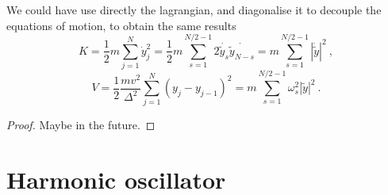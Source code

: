     We could have use directly the lagrangian, and diagonalise it to decouple the equations of motion, to obtain the same results 
    \begin{equation*}
        K = \frac{1}{2} m \sum_{j=1}^{N} \dot y_j^2 = \frac{1}{2} m \sum_{s = 1}^{N/2 - 1} 2 \dot{\tilde y_s} \dot{\tilde y_{N-s}} = m \sum_{s=1}^{N/2 - 1} |\dot{\tilde y}|^2 ~,
    \end{equation*}
    \begin{equation*}
        V = \frac{1}{2} \frac{m v^2}{\Delta^2} \sum_{j=1}^{N} (y_j - y_{j-1})^2 = m \sum_{s=1}^{N/2 - 1} \omega^2_s |\tilde y|^2 ~.
    \end{equation*}
    \begin{proof}
        Maybe in the future.
    \end{proof}

\section{Harmonic oscillator}

